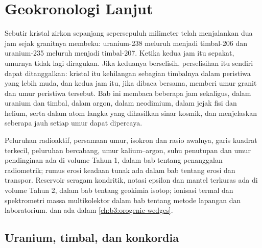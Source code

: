 \chapter{Geokronologi Lanjut}\label{ch:b3:advanced-geochronology}

Sebutir kristal zirkon sepanjang sepersepuluh milimeter telah menjalankan dua jam
sejak granitnya membeku: uranium-238 meluruh menjadi timbal-206 dan
uranium-235 meluruh menjadi timbal-207. Ketika kedua jam itu sepakat, umurnya
tidak lagi diragukan. Jika keduanya berselisih, perselisihan itu sendiri dapat ditanggalkan: kristal
itu kehilangan sebagian timbalnya dalam peristiwa yang lebih muda, dan kedua jam itu, jika dibaca
bersama, memberi umur granit dan umur peristiwa tersebut. Bab ini
membaca beberapa jam sekaligus, dalam uranium dan timbal, dalam argon, dalam neodimium, dalam
jejak fisi dan helium, serta dalam atom langka yang dihasilkan sinar kosmik, dan menjelaskan
seberapa jauh setiap umur dapat dipercaya.

\begin{recall}
Peluruhan radioaktif, persamaan umur, isokron dan rasio awalnya, garis
kuadrat terkecil, peluruhan bercabang, umur kalium--argon, suhu
penutupan dan umur pendinginan ada di volume Tahun 1, dalam bab tentang
penanggalan radiometrik; rumus erosi keadaan tunak  ada dalam
bab tentang erosi dan transpor. Reservoir seragam kondritik, notasi
epsilon dan mantel terkuras ada di volume Tahun 2, dalam bab tentang
geokimia isotop; ionisasi termal dan spektrometri massa
multikolektor dalam bab tentang metode lapangan dan laboratorium.  dan
 ada dalam \cref{ch:b3:orogenic-wedges}.
\end{recall}

\section{Uranium, timbal, dan konkordia}\label{sec:b3:advanced-geochronology:upb}

